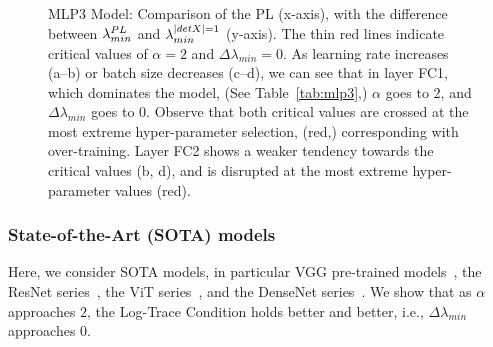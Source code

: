 \begin{figure}[t]
{    }
    \caption{
            MLP3 Model: Comparison of the PL \ALPHA (x-axis), with the difference between $\lambda^{PL}_{min}$ and $\lambda^{\vert detX\vert=1}_{min}$ 
            (y-axis). The thin red lines indicate critical values of $\alpha=2$ and $\Delta \lambda_{min} = 0$. As 
            learning rate increases (a--b) or batch size decreases (c--d), we can see that in layer FC1, which dominates 
            the model, (See Table~\ref{tab:mlp3},) $\alpha$ goes to $2$, and $\Delta \lambda_{min}$ goes to $0$. Observe 
            that both critical values are crossed at the most extreme hyper-parameter selection, (red,) corresponding 
            with over-training. Layer FC2 shows a weaker tendency towards the critical values (b, d), and is disrupted 
            at the most extreme hyper-parameter values (red).
    }
 \label{fig:mlp3-detx-gap}
\end{figure}


\subsubsection{State-of-the-Art (SOTA) models}
\label{sxn:detx-sota}

Here, we consider SOTA models, 
in particular VGG pre-trained models~\cite{VGG14_TR}, the ResNet series~\cite{ResNet15_TR}, the ViT 
series~\cite{VIT20_TR}, and the DenseNet series~\cite{DenseNet17_TR}.
We show that as $\alpha$ approaches $2$, the Log-Trace Condition holds better and better, i.e., $\Delta\lambda_{min}$ 
approaches $0$.

